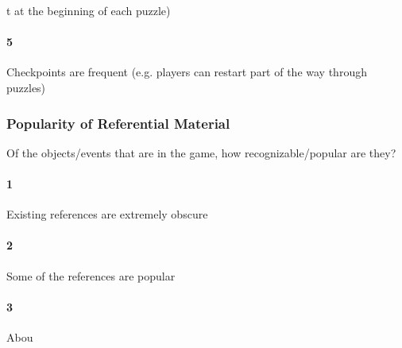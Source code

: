 t at the beginning of each puzzle)\paragraph{5}Checkpoints are frequent (e.g. players can restart part of the way through puzzles)\subsubsection{Popularity of Referential Material}Of the objects/events that are in the game, how recognizable/popular are they?\paragraph{1}Existing references are extremely obscure\paragraph{2}Some of the references are popular\paragraph{3}Abou